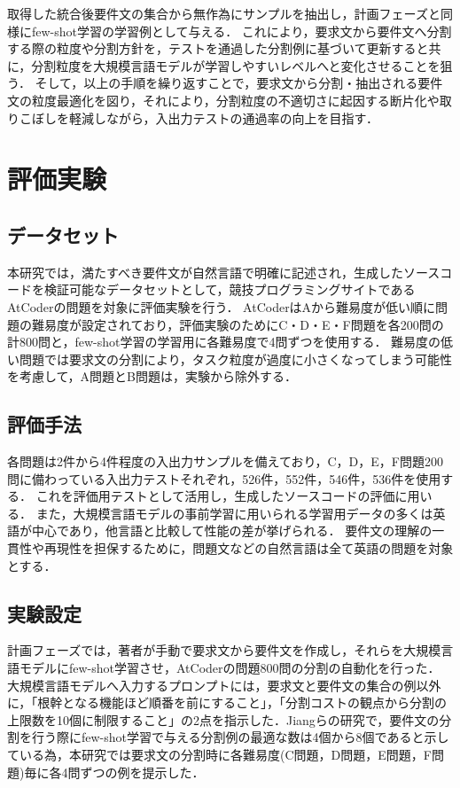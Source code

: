 \documentclass[11pt]{jreport}
\begin{document}
取得した統合後要件文の集合から無作為にサンプルを抽出し，計画フェーズと同様にfew-shot学習の学習例として与える．
これにより，要求文から要件文へ分割する際の粒度や分割方針を，テストを通過した分割例に基づいて更新すると共に，分割粒度を大規模言語モデルが学習しやすいレベルへと変化させることを狙う．
そして，以上の手順を繰り返すことで，要求文から分割・抽出される要件文の粒度最適化を図り，それにより，分割粒度の不適切さに起因する断片化や取りこぼしを軽減しながら，入出力テストの通過率の向上を目指す．



\chapter{評価実験}
\section{データセット}
本研究では，満たすべき要件文が自然言語で明確に記述され，生成したソースコードを検証可能なデータセットとして，競技プログラミングサイトであるAtCoderの問題を対象に評価実験を行う．
AtCoderはAから難易度が低い順に問題の難易度が設定されており，評価実験のためにC・D・E・F問題を各200問の計800問と，few-shot学習の学習用に各難易度で4問ずつを使用する．
難易度の低い問題では要求文の分割により，タスク粒度が過度に小さくなってしまう可能性を考慮して，A問題とB問題は，実験から除外する．

\section{評価手法}
各問題は2件から4件程度の入出力サンプルを備えており，C，D，E，F問題200問に備わっている入出力テストそれぞれ，526件，552件，546件，536件を使用する．
これを評価用テストとして活用し，生成したソースコードの評価に用いる．
また，大規模言語モデルの事前学習に用いられる学習用データの多くは英語が中心であり，他言語と比較して性能の差が挙げられる\cite{LLM_English}．
要件文の理解の一貫性や再現性を担保するために，問題文などの自然言語は全て英語の問題を対象とする．


\section{実験設定}
計画フェーズでは，著者が手動で要求文から要件文を作成し，それらを大規模言語モデルにfew-shot学習させ，AtCoderの問題800問の分割の自動化を行った．
大規模言語モデルへ入力するプロンプトには，要求文と要件文の集合の例以外に，「根幹となる機能ほど順番を前にすること」，「分割コストの観点から分割の上限数を10個に制限すること」の2点を指示した．Jiangらの研究\cite{TOSEM}で，要件文の分割を行う際にfew-shot学習で与える分割例の最適な数は4個から8個であると示している為，本研究では要求文の分割時に各難易度(C問題，D問題，E問題，F問題)毎に各4問ずつの例を提示した．
\end{document}
